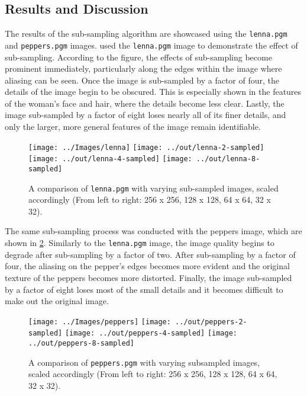 \documentclass[headings=optiontoheadandtoc,listof=totoc,parskip=full]{scrartcl}
\begin{document}
\subsection{Results and Discussion}
The results of the sub-sampling algorithm are showcased using the \texttt{lenna.pgm} and \texttt{peppers.pgm} images.  used the \texttt{lenna.pgm} image to demonstrate the effect of sub-sampling. According to the figure, the effects of sub-sampling become prominent immediately, particularly along the edges within the image where aliasing can be seen. Once the image is sub-sampled by a factor of four, the details of the image begin to be obscured. This is especially shown in the features of the woman’s face and hair, where the details become less clear. Lastly, the image sub-sampled by a factor of eight loses nearly all of its finer details, and only the larger, more general features of the image remain identifiable. 

\begin{figure}[ht]
	\centering
	\texttt{[image: ../Images/lenna]}
	\texttt{[image: ../out/lenna-2-sampled]}
	\texttt{[image: ../out/lenna-4-sampled]}
	\texttt{[image: ../out/lenna-8-sampled]}
	\caption{A comparison of \texttt{lenna.pgm} with varying sub-sampled images, scaled accordingly (From left to right: 256 x 256, 128 x 128, 64 x 64, 32 x 32).}
	\label{fig:sample-result-1}
\end{figure}

The same sub-sampling process was conducted with the peppers image, which are shown in \cref{fig:sample-result-2}. Similarly to the \texttt{lenna.pgm} image, the image quality begins to degrade after sub-sampling by a factor of two. After sub-sampling by a factor of four, the aliasing on the pepper’s edges becomes more evident and the original texture of the peppers becomes more distorted. Finally, the image sub-sampled by a factor of eight loses most of the small details and it becomes difficult to make out the original image.

\begin{figure}[ht]
	\centering
	\texttt{[image: ../Images/peppers]}
	\texttt{[image: ../out/peppers-2-sampled]}
	\texttt{[image: ../out/peppers-4-sampled]}
	\texttt{[image: ../out/peppers-8-sampled]}
	\caption{A comparison of \texttt{peppers.pgm} with varying subsampled images, scaled accordingly (From left to right: 256 x 256, 128 x 128, 64 x 64, 32 x 32).}
	\label{fig:sample-result-2}
\end{figure}
\end{document}
